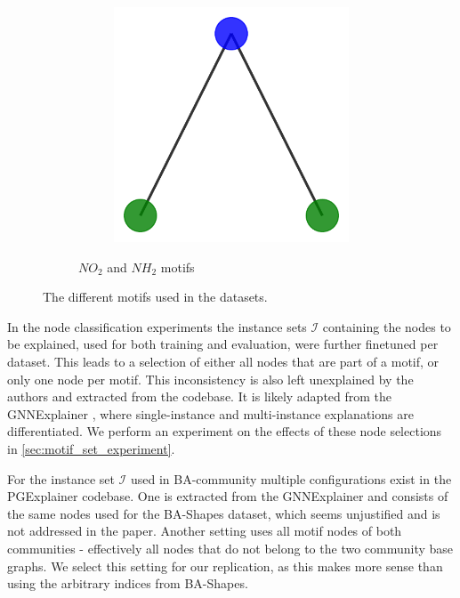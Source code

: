\begin{figure}[h]
\begin{subfigure}[b]{0.30\textwidth}
\begin{subfigure}[b]{0.48\linewidth}
        \end{subfigure}
        \begin{subfigure}[b]{0.48\linewidth}
            \includegraphics[width=\linewidth]{img/Motif_Vis/MUTAG-MOTIF2.pdf}
        \end{subfigure}
        \caption{$NO_2$ and $NH_2$ motifs}
        \label{fig:subfig4}
    \end{subfigure}
    
    \caption{The different motifs used in the datasets.}
    \label{fig:motifs}
\end{figure}

In the node classification experiments the instance sets $\mathcal{I}$ containing the nodes to be explained, used for both training and evaluation, were further finetuned per dataset. This leads to a selection of either all nodes that are part of a motif, or only one node per motif. This inconsistency is also left unexplained by the authors and extracted from the codebase. It is likely adapted from the GNNExplainer \cite{ying2019gnnexplainer}, where single-instance and multi-instance explanations are differentiated. We perform an experiment on the effects of these node selections in \ref{sec:motif_set_experiment}.

For the instance set $\mathcal{I}$ used in BA-community multiple configurations exist in the PGExplainer codebase. One is extracted from the GNNExplainer \cite{ying2019gnnexplainer} and consists of the same nodes used for the BA-Shapes dataset, which seems unjustified and is not addressed in the paper. Another setting uses all motif nodes of both communities - effectively all nodes that do not belong to the two community base graphs. We select this setting for our replication, as this makes more sense than using the arbitrary indices from BA-Shapes. \bigskip

